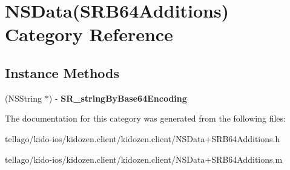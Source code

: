 \hypertarget{category_n_s_data_07_s_r_b64_additions_08}{\section{N\-S\-Data(S\-R\-B64\-Additions) Category Reference}
\label{category_n_s_data_07_s_r_b64_additions_08}
}
\subsection*{Instance Methods}
\begin{DoxyCompactItemize}
\item 
\hypertarget{category_n_s_data_07_s_r_b64_additions_08_a8e6751391e4b2d29d66742d1baf81861}{(N\-S\-String $\ast$) -\/ {\bfseries S\-R\-\_\-string\-By\-Base64\-Encoding}}\label{category_n_s_data_07_s_r_b64_additions_08_a8e6751391e4b2d29d66742d1baf81861}

\end{DoxyCompactItemize}


The documentation for this category was generated from the following files\-:\begin{DoxyCompactItemize}
\item 
tellago/kido-\/ios/kidozen.\-client/kidozen.\-client/N\-S\-Data+\-S\-R\-B64\-Additions.\-h\item 
tellago/kido-\/ios/kidozen.\-client/kidozen.\-client/N\-S\-Data+\-S\-R\-B64\-Additions.\-m\end{DoxyCompactItemize}
